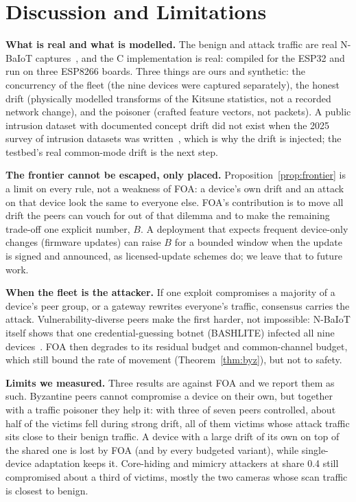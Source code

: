 \section{Discussion and Limitations}\label{sec:discussion}

\textbf{What is real and what is modelled.} The benign and attack traffic are real N-BaIoT
captures~\cite{nbaiot}, and the C implementation is real: compiled for the ESP32 and run on three ESP8266 boards. Three things are
ours and synthetic: the concurrency of the fleet (the nine devices were captured separately), the honest
drift (physically modelled transforms of the Kitsune statistics, not a recorded network change), and the
poisoner (crafted feature vectors, not packets). A public intrusion dataset with documented concept
drift did not exist when the 2025 survey of intrusion datasets was written~\cite{nidsurvey}, which is
why the drift is injected; the testbed's real common-mode drift is the next step.

\textbf{The frontier cannot be escaped, only placed.} Proposition~\ref{prop:frontier} is a limit on
every rule, not a weakness of FOA: a device's own drift and an attack on that device look the same to
everyone else. FOA's contribution is to move all drift the peers can vouch for out of that dilemma and
to make the remaining trade-off one explicit number, $B$. A deployment that expects frequent device-only
changes (firmware updates) can raise $B$ for a bounded window when the update is signed and announced, as
licensed-update schemes do; we leave that to future work.

\textbf{When the fleet is the attacker.} If one exploit compromises a majority of a device's peer group,
or a gateway rewrites everyone's traffic, consensus carries the attack. Vulnerability-diverse peers make
the first harder, not impossible: N-BaIoT itself shows that one credential-guessing botnet (BASHLITE)
infected all nine devices~\cite{nbaiot}. FOA then degrades to its residual budget and common-channel
budget, which still bound the rate of movement (Theorem~\ref{thm:byz}), but not to safety.

\textbf{Limits we measured.} Three results are against FOA and we report them as such. Byzantine
peers cannot compromise a device on their own, but together with a traffic poisoner they help it: with
three of seven peers controlled, about half of the victims fell during strong drift, all of them victims
whose attack traffic sits close to their benign traffic. A device with a large drift of its own on
top of the shared one is lost by FOA (and by every budgeted variant), while single-device adaptation
keeps it. Core-hiding and mimicry attackers at share 0.4 still compromised about a third of victims,
mostly the two cameras whose scan traffic is closest to benign.

